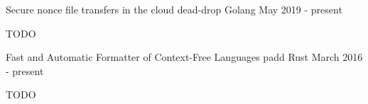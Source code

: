 
\begin{cventries}

\cventry
    {Secure nonce file transfers in the cloud}
    {dead-drop}
    {Golang}
    {May 2019 - present}
    {
      \begin{cvitems}
      	\item TODO
      \end{cvitems}
    }

\cventry
    {Fast and Automatic Formatter of Context-Free Languages}
    {padd}
    {Rust}
    {March 2016 - present}
    {
      \begin{cvitems}
      	\item TODO
      \end{cvitems}
    }

\end{cventries}
